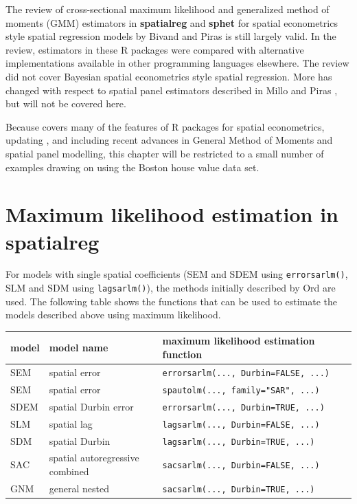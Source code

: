 \documentclass[]{book}
\begin{document}
The review of cross-sectional maximum likelihood and generalized method of moments (GMM) estimators in \textbf{spatialreg} \citep{R-spatialreg} and \textbf{sphet} for spatial econometrics style spatial regression models by Bivand and Piras \citeyearpar{bivand+piras:15} is still largely valid. In the review, estimators in these R packages were compared with alternative implementations available in other programming languages elsewhere. The review did not cover Bayesian spatial econometrics style spatial regression. More has changed with respect to spatial panel estimators described in Millo and Piras \citeyearpar{millo+piras:12}, but will not be covered here.

Because \citet{math9111276} covers many of the features of R packages for spatial econometrics, updating \citet{bivand+piras:15}, and including recent advances in General Method of Moments and spatial panel modelling, this chapter will be restricted to a small number of examples drawing on \citet{bivand17} using the Boston house value data set.

\hypertarget{maximum-likelihood-estimation-in-spatialreg}{%
\section{\texorpdfstring{Maximum likelihood estimation in \textbf{spatialreg}}{Maximum likelihood estimation in spatialreg}}\label{maximum-likelihood-estimation-in-spatialreg}}

For models with single spatial coefficients (SEM and SDEM using \texttt{errorsarlm()}, SLM and SDM using \texttt{lagsarlm()}), the methods initially described by Ord \citeyearpar{ord:75} are used. The following table shows the functions that can be used to estimate the models described above using maximum likelihood.

\begin{longtable}[]{@{}lll@{}}
\toprule
model & model name & maximum likelihood estimation function\tabularnewline
\midrule
\endhead
SEM & spatial error & \texttt{errorsarlm(...,\ Durbin=FALSE,\ ...)}\tabularnewline
SEM & spatial error & \texttt{spautolm(...,\ family="SAR",\ ...)}\tabularnewline
SDEM & spatial Durbin error & \texttt{errorsarlm(...,\ Durbin=TRUE,\ ...)}\tabularnewline
SLM & spatial lag & \texttt{lagsarlm(...,\ Durbin=FALSE,\ ...)}\tabularnewline
SDM & spatial Durbin & \texttt{lagsarlm(...,\ Durbin=TRUE,\ ...)}\tabularnewline
SAC & spatial autoregressive combined & \texttt{sacsarlm(...,\ Durbin=FALSE,\ ...)}\tabularnewline
GNM & general nested & \texttt{sacsarlm(...,\ Durbin=TRUE,\ ...)}\tabularnewline
\bottomrule
\end{longtable}
\end{document}
